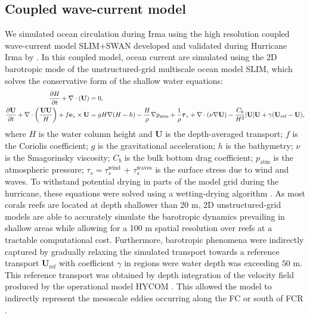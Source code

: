 \documentclass[fleqn,10pt]{wlscirep}
\newcommand{\UV}{\mathbf{U}}
\begin{document}
\subsection{Coupled wave-current model}
We simulated ocean circulation during Irma using the high resolution coupled wave-current model SLIM+SWAN developed and validated during Hurricane Irma by \citep{DobbyIrma}. In this coupled model, ocean current are simulated using the 2D barotropic mode of the unstructured-grid multiscale ocean model SLIM, which solves the conservative form of the shallow water equations:
\begin{align}
\dfrac{\partial H}{\partial t} +\nabla\cdot(\UV) &= 0, \label{eq:slim_1}\\
\dfrac{\partial \UV}{\partial t}  + \nabla\cdot\left(\dfrac{\UV\UV}{H}\right) + f\mathbf{e}_z \times \UV &= gH\nabla(H-h) - \dfrac{H}{\rho}\nabla p_\text{atm} + \dfrac{1}{\rho}\text{\boldmath$\tau$}_s +\nabla\cdot(\nu\nabla\UV) - \dfrac{C_b}{H^2}|\UV|\UV + \gamma(\UV_\text{ref}-\UV), \label{eq:slim_2}
\end{align}
where $H$ is the water column height and $\UV$ is the depth-averaged transport; $f$ is the Coriolis coefficient; $g$ is the gravitational acceleration; $h$ is the bathymetry; $\nu$  is the Smagorinsky viscosity; $C_b$ is the bulk bottom drag coefficient; $p_\text{atm}$ is the atmospheric pressure; {\boldmath$\tau$}$_s = ${\boldmath$\tau$}$_s^\text{wind}$ + {\boldmath$\tau$}$_s^\text{waves}$ is the surface stress due to wind and waves. To withstand potential drying in parts of the model grid during the hurricane, these equations were solved using a wetting-drying algorithm \citep{Le2020Aug}. As most corals reefs are located at depth shallower than 20 m, 2D unstructured-grid models are able to accurately simulate the barotropic dynamics prevailing in shallow areas while allowing for a 100 m spatial resolution over reefs at a tractable computational cost. Furthermore, barotropic phenomena were indirectly captured by gradually relaxing the simulated transport towards a reference transport $\UV_\text{ref}$ with coefficient $\gamma$ in regions were water depth was exceeding $50$ m. This reference transport was obtained by depth integration of the velocity field produced by the operational model HYCOM \citep{Chassignet2007Mar}. This allowed the model to indirectly represent the mesoscale eddies occurring along the FC or south of FCR \citep{Frys2020}.
\end{document}
